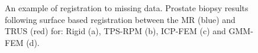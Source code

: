 \documentclass[journal]{IEEEtran}
\begin{document}
\begin{figure}
    \caption{An example of registration to missing data. Prostate biopsy results following surface based registration between the MR (blue) and TRUS (red) for: Rigid (a), TPS-RPM (b), ICP-FEM (c) and GMM-FEM (d). \label{fig:exp1fig1}}    
\end{figure}
\end{document}
